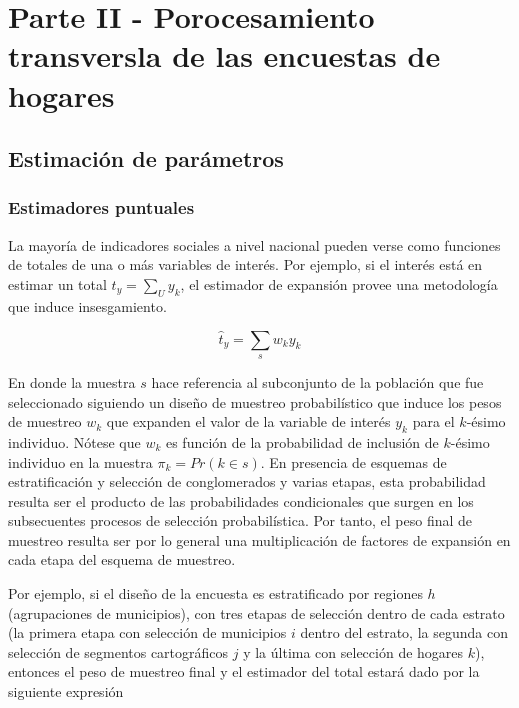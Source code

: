 \documentclass[
  12pt,
  spanish,
]{book}
\begin{document}
\hypertarget{part-parte-ii---porocesamiento-transversla-de-las-encuestas-de-hogares}{%
\part{Parte II - Porocesamiento transversla de las encuestas de hogares}\label{part-parte-ii---porocesamiento-transversla-de-las-encuestas-de-hogares}}

\hypertarget{estimaciuxf3n-de-paruxe1metros}{%
\chapter{Estimación de parámetros}\label{estimaciuxf3n-de-paruxe1metros}}

\hypertarget{estimadores-puntuales}{%
\section{Estimadores puntuales}\label{estimadores-puntuales}}

La mayoría de indicadores sociales a nivel nacional pueden verse como funciones de totales de una o más variables de interés. Por ejemplo, si el interés está en estimar un total \(t_y=\sum_U y_k\), el estimador de expansión provee una metodología que induce insesgamiento.

\[
\hat{t}_y = \sum_s w_k y_k
\]

En donde la muestra \(s\) hace referencia al subconjunto de la población que fue seleccionado siguiendo un diseño de muestreo probabilístico que induce los pesos de muestreo \(w_k\) que expanden el valor de la variable de interés \(y_k\) para el \(k\)-ésimo individuo. Nótese que \(w_k\) es función de la probabilidad de inclusión de \(k\)-ésimo individuo en la muestra \(\pi_k=Pr(k\in s)\). En presencia de esquemas de estratificación y selección de conglomerados y varias etapas, esta probabilidad resulta ser el producto de las probabilidades condicionales que surgen en los subsecuentes procesos de selección probabilística. Por tanto, el peso final de muestreo resulta ser por lo general una multiplicación de factores de expansión en cada etapa del esquema de muestreo.

Por ejemplo, si el diseño de la encuesta es estratificado por regiones \(h\) (agrupaciones de municipios), con tres etapas de selección dentro de cada estrato (la primera etapa con selección de municipios \(i\) dentro del estrato, la segunda con selección de segmentos cartográficos \(j\) y la última con selección de hogares \(k\)), entonces el peso de muestreo final y el estimador del total estará dado por la siguiente expresión
\end{document}
